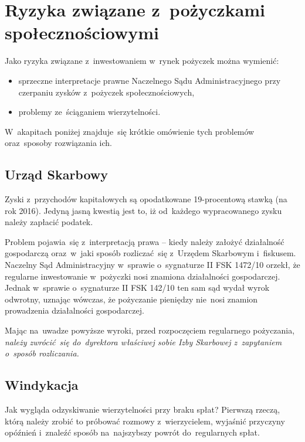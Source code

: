 \documentclass[a4paper,twoside,titlepage,openright]{book}
\begin{document}
 
\section{Ryzyka związane z~pożyczkami społecznościowymi}

Jako ryzyka związane z~inwestowaniem w~rynek pożyczek można wymienić:

\begin{itemize}
\item sprzeczne interpretacje prawne Naczelnego Sądu Administracyjnego przy czerpaniu zysków z~pożyczek społecznościowych,
\item problemy ze~ściąganiem wierzytelności.
\end{itemize}

W~akapitach poniżej znajduje~się krótkie omówienie tych problemów oraz~sposoby rozwiązania ich.

\subsection*{Urząd Skarbowy}
Zyski z~przychodów kapitałowych są opodatkowane 19-procentową stawką (na rok 2016). Jedyną jasną kwestią jest to, iż od~każdego wypracowanego zysku należy zapłacić podatek. 

Problem pojawia~się z~interpretacją prawa -- kiedy należy założyć działalność gospodarczą oraz~w~jaki sposób rozliczać~się z~Urzędem Skarbowym i~fiskusem. Naczelny Sąd Administracyjny w~sprawie o~sygnaturze II FSK 1472/10 orzekł, że regularne inwestowanie w~pożyczki nosi znamiona działalności gospodarczej.\cite{nsaZnamiona} Jednak w~sprawie o~sygnaturze II FSK 142/10 ten sam sąd wydał wyrok odwrotny, uznając wówczas, że pożyczanie pieniędzy nie~nosi znamion prowadzenia działalności gospodarczej.\cite{nsaWyrokOdwrotny} 

Mając na~uwadze powyższe wyroki, przed rozpoczęciem regularnego pożyczania, \emph{należy zwrócić~się do~dyrektora właściwej sobie Izby Skarbowej z~zapytaniem o~sposób rozliczania.}\cite{oswiadczenieKokos}

\subsection*{Windykacja}

Jak wygląda odzyskiwanie wierzytelności przy braku spłat? Pierwszą rzeczą, którą należy zrobić to próbować rozmowy z~wierzycielem, wyjaśnić przyczyny opóźnień i~znaleźć sposób na~najszybszy powrót do~regularnych spłat. 
\end{document}
